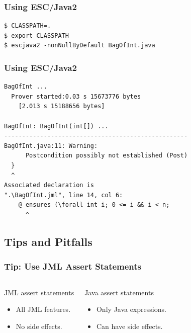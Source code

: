 \begin{frame}[fragile]
\frametitle{Using ESC/Java2}

\begin{example}
\begin{verbatim}
$ CLASSPATH=.
$ export CLASSPATH
$ escjava2 -nonNullByDefault BagOfInt.java
\end{verbatim}
\end{example}
\end{frame}

\begin{frame}[fragile]
\frametitle{Using ESC/Java2}

{\small
\begin{verbatim}
BagOfInt ...
  Prover started:0.03 s 15673776 bytes
    [2.013 s 15188656 bytes]

BagOfInt: BagOfInt(int[]) ...
---------------------------------------------------
BagOfInt.java:11: Warning: 
      Postcondition possibly not established (Post)
  }
  ^
Associated declaration is 
".\BagOfInt.jml", line 14, col 6:
    @ ensures (\forall int i; 0 <= i && i < n;
      ^
\end{verbatim}
}
\end{frame}

\subsection[Tips/Pitfalls]{Tips and Pitfalls}

\begin{frame}
\frametitle{Tip: Use JML Assert Statements}

\begin{columns}[t]
\begin{block}{JML assert statements}
\begin{itemize}
\item
All JML features.

\item
No side effects.
\end{itemize}
\end{block}

\begin{block}{Java assert statements}
\begin{itemize}
\item
Only Java expressions.

\item
Can have side effects.
\end{itemize}
\end{block}
\end{columns}

\end{frame}

